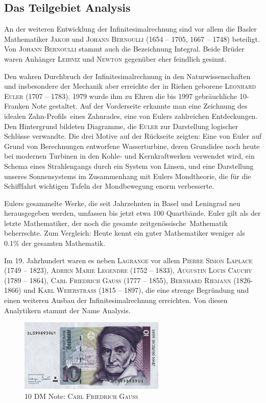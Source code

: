 \documentclass[%
11pt,%
twoside,%
titlepage,%
german,%
headsepline%
]{scrartcl}
\newcommand{\definition}[1]{\colorbox{emerald}{#1}}
\theoremstyle{definition}
\theoremstyle{plain}
\begin{document}
\subsection{Das Teilgebiet Analysis}

An der weiteren Entwicklung der Infinitesimalrechnung sind vor allem die Basler Mathematiker \textsc{Jakob} und \textsc{Johann Bernoulli} (1654 -- 1705, 1667 -- 1748) beteiligt. Von \textsc{Johann Bernoulli} stammt auch die Bezeichnung \glqq Integral\grqq. Beide Brüder waren Anhänger \textsc{Leibniz} und \textsc{Newton} gegenüber eher feindlich gesinnt.

Den wahren Durchbruch der Infinitesimalrechnung in den Naturwissenschaften und insbesondere der Mechanik aber erreichte der in Riehen geborene \textsc{Leonhard Euler} (1707 -- 1783). 1979 wurde ihm zu Ehren die bis 1997 gebräuchliche 10-Franken Note gestaltet.
Auf der Vorderseite erkannte man eine Zeichnung des idealen \glqq Zahn-Profils\grqq\ eines Zahnrades, eine von Eulers zahlreichen Entdeckungen. Den Hintergrund bildeten Diagramme, die \textsc{Euler} zur Darstellung logischer Schlüsse verwandte. Die drei Motive auf der Rückseite zeigten: Eine von Euler auf Grund von Berechnungen entworfene Wasserturbine, deren Grundidee noch heute bei modernen Turbinen in den Kohle- und Kernkraftwerken verwendet wird, ein Schema eines Strahlengangs durch ein System von Linsen, und eine Darstellung unseres Sonnensystems im Zusammenhang mit Eulers Mondtheorie, die für die Schifffahrt wichtigen Tafeln der Mondbewegung enorm verbesserte.

Eulers gesammelte Werke, die seit Jahrzehnten in Basel und Leningrad neu herausgegeben werden, umfassen bis jetzt etwa 100 Quartbände. Euler gilt als der letzte Mathematiker, der noch die gesamte \glqq zeitgenössische\grqq\ Mathematik beherrschte. Zum Vergleich: Heute kennt ein guter Mathematiker weniger als  0.1\% der gesamten Mathematik.

Im 19. Jahrhundert waren es neben \textsc{Lagrange} vor allem \textsc{Pierre Simon Laplace} (1749 -- 1823), \textsc{Adrien Marie Legendre} (1752 -- 1833), \textsc{Augustin Louis Cauchy} (1789 -- 1864), \textsc{Carl Friedrich Gauss} (1777 -- 1855), \textsc{Bernhard Riemann} (1826-1866) und \textsc{Karl Weierstrass} (1815 -- 1897), die eine strenge Begründung und einen weiteren Ausbau der Infinitesimalrechnung erreichten. Von diesen Analytikern stammt der Name \definition{Analysis}.

\begin{figure}
\begin{center}
\includegraphics[width=0.618\textwidth]{pictures/gauss}
\caption{10 DM Note: \textsc{Carl Friedrich Gauss}}
\end{center}
\end{figure}
\end{document}
